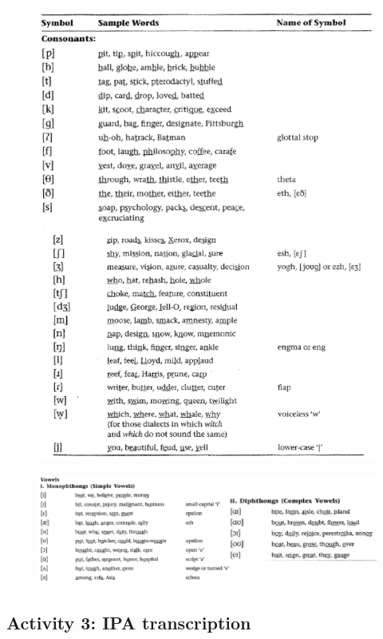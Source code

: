 \documentclass[11pt, oneside]{article}   	%
\begin{document}
\begin{figure}[h!]
\centering
\includegraphics[scale=0.75]{consonants.png}
\end{figure}

\begin{figure}[h!]
\centering
\includegraphics[scale=0.75]{vowels_IPA.png}
\end{figure}

\newpage

\subsection{Activity 3: IPA transcription}
\end{document}
